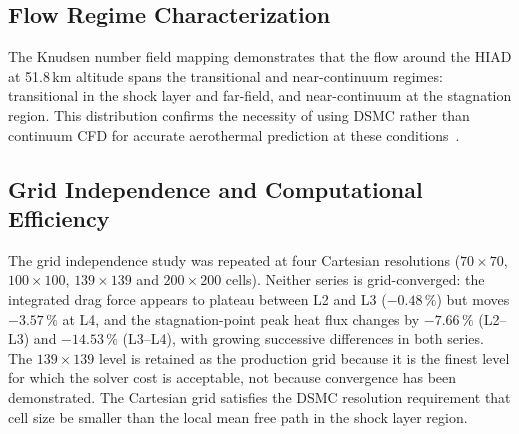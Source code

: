 \subsection{Flow Regime Characterization}
The Knudsen number field mapping demonstrates that the flow around the HIAD at 51.8\,km altitude spans the transitional and near-continuum regimes: transitional in the shock layer and far-field, and near-continuum at the stagnation region. This distribution confirms the necessity of using DSMC rather than continuum CFD for accurate aerothermal prediction at these conditions~\cite{bird1994molecular, plimpton2014sparta}.

\subsection{Grid Independence and Computational Efficiency}
The grid independence study was repeated at four Cartesian resolutions ($70\times70$, $100\times100$, $139\times139$ and $200\times200$ cells). Neither series is grid-converged: the integrated drag force appears to plateau between L2 and L3 ($-0.48\,\%$) but moves $-3.57\,\%$ at L4, and the stagnation-point peak heat flux changes by $-7.66\,\%$ (L2--L3) and $-14.53\,\%$ (L3--L4), with growing successive differences in both series. The $139\times139$ level is retained as the production grid because it is the finest level for which the solver cost is acceptable, not because convergence has been demonstrated. The Cartesian grid satisfies the DSMC resolution requirement that cell size be smaller than the local mean free path in the shock layer region.

